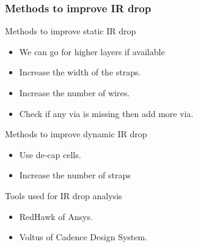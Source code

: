 \documentclass{beamer}
\begin{document}
	\begin{frame}
		\frametitle{Methods to improve IR drop}
		\begin{block}{Methods to improve static IR drop}
			\begin{itemize}
				\item We can go for higher layers if available
				\item Increase the width of the straps.
				\item Increase the number of wires.
				\item Check if any via is missing then add more via.
			\end{itemize}
		\end{block}
				\begin{block}{Methods to improve dynamic IR drop}
			\begin{itemize}
				\item Use de-cap cells.
				\item Increase the number of straps
			\end{itemize}
		\end{block}
		\begin{alertblock}{Tools used for IR drop analysis}
		\begin{itemize}
			\item RedHawk of Ansys.
			\item Voltus of Cadence Design System.
		\end{itemize}
		\end{alertblock}
	\end{frame}
	
\end{document}
